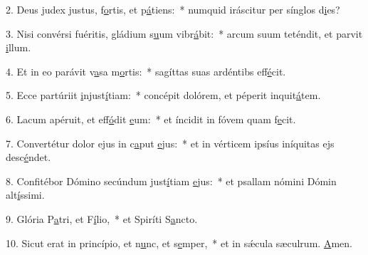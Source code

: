 2. Deus judex justus, f\uline{o}rtis, et p\uline{á}tiens:~* numquid iráscitur per sínglos d\uline{i}es?\par 
3. Nisi convérsi fuéritis, gládium s\uline{u}um vibr\uline{á}bit:~* arcum suum teténdit, et parvit \uline{i}llum.\par 
4. Et in eo parávit v\uline{a}sa m\uline{o}rtis:~* sagíttas suas ardéntibs eff\uline{é}cit.\par 
5. Ecce partúriit \uline{i}njust\uline{í}tiam:~* concépit dolórem, et péperit inquit\uline{á}tem.\par 
6. Lacum apéruit, et eff\uline{ó}dit \uline{e}um:~* et íncidit in fóvem quam f\uline{e}cit.\par 
7. Convertétur dolor ejus in c\uline{a}put \uline{e}jus:~* et in vérticem ipsíus iníquitas ejs desc\uline{é}ndet.\par 
8. Confitébor Dómino secúndum just\uline{í}tiam \uline{e}jus:~* et psallam nómini Dómin alt\uline{í}ssimi.\par 
9. Glória P\uline{a}tri, et F\uline{í}lio,~* et Spiríti S\uline{a}ncto.\par 
10. Sicut erat in princípio, et n\uline{u}nc, et s\uline{e}mper,~* et in sǽcula sæculrum. \uline{A}men.\par 
